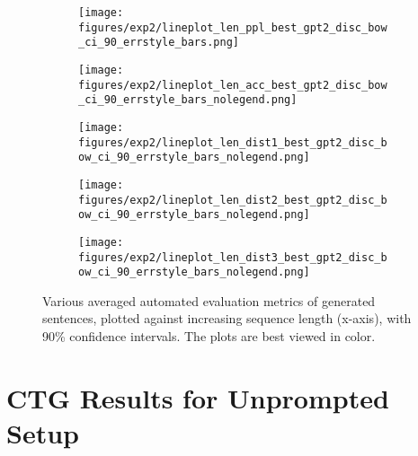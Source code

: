 \begin{figure}[H]
     \centering
     \begin{subfigure}[b]{0.32\textwidth}
        \centering
        \texttt{[image: figures/exp2/lineplot\_len\_ppl\_best\_gpt2\_disc\_bow\_ci\_90\_errstyle\_bars.png]}
        \caption{}
        \label{fig:ctg_lineplot_len_vs_ppl}
     \end{subfigure}
    \quad
     \begin{subfigure}[b]{0.32\textwidth}
        \centering
        \texttt{[image: figures/exp2/lineplot\_len\_acc\_best\_gpt2\_disc\_bow\_ci\_90\_errstyle\_bars\_nolegend.png]}
        \caption{}
        \label{fig:ctg_lineplot_len_vs_acc}
     \end{subfigure}
     \begin{subfigure}[b]{0.32\textwidth}
        \centering
        \texttt{[image: figures/exp2/lineplot\_len\_dist1\_best\_gpt2\_disc\_bow\_ci\_90\_errstyle\_bars\_nolegend.png]}
        \caption{}
        \label{fig:ctg_lineplot_len_vs_dist1}
     \end{subfigure}
     
     \medskip
     
     \begin{subfigure}[b]{0.32\textwidth}
        \centering
        \texttt{[image: figures/exp2/lineplot\_len\_dist2\_best\_gpt2\_disc\_bow\_ci\_90\_errstyle\_bars\_nolegend.png]}
        \caption{}
        \label{fig:ctg_lineplot_len_vs_dist2}
     \end{subfigure}
     \quad
     \begin{subfigure}[b]{0.32\textwidth}
        \centering
        \texttt{[image: figures/exp2/lineplot\_len\_dist3\_best\_gpt2\_disc\_bow\_ci\_90\_errstyle\_bars\_nolegend.png]}
        \caption{}
        \label{fig:ctg_lineplot_len_vs_dist3}
     \end{subfigure}
     
        \caption{ Various averaged automated evaluation metrics of generated sentences, plotted against increasing sequence length (x-axis), with 90\% confidence intervals. The plots are best viewed in color.}
        \label{fig:ctg_lineplots_len_vs_metrics}
\end{figure}

\section{CTG Results for Unprompted Setup }

